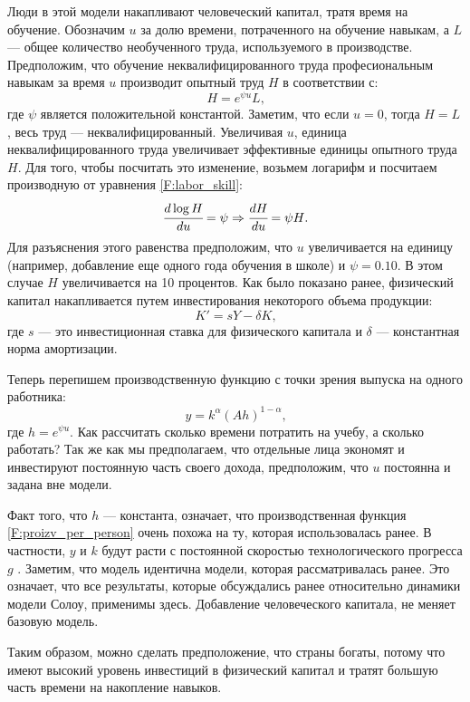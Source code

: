 Люди в этой модели накапливают человеческий капитал, тратя время на обучение.
Обозначим $u$ за долю времени, потраченного на обучение навыкам, а $L$ --- общее количество необученного труда, используемого в производстве.
Предположим, что обучение неквалифицированного труда професиональным навыкам за время $u$ производит опытный труд $H$ в соответствии с:
\begin{equation}
H=e^{\psi u} L \text{,}
\label{F:labor_skill}
\end{equation}
где $\psi$ является положительной константой.
Заметим, что если $u = 0$, тогда $H = L$, весь труд --- неквалифицированный.
Увеличивая $u$, единица неквалифицированного труда увеличивает эффективные единицы опытного труда $H$.
Для того, чтобы посчитать это изменение, возьмем логарифм и посчитаем производную от уравнения \ref{F:labor_skill}:
\begin{equation*}
\cfrac{d \log{H}}{du} = \psi \Rightarrow \cfrac{dH}{du}=\psi H\text{.}
\end{equation*}
Для разъяснения этого равенства предположим, что $u$ увеличивается на единицу (например, добавление еще одного года обучения в школе) и $\psi = 0.10$.
В этом случае $H$ увеличивается на 10 процентов.
Как было показано ранее, физический капитал накапливается путем инвестирования некоторого объема продукции:
\begin{equation*}
K'=sY - \delta K \text{,}
\end{equation*}
где $s$ --- это инвестиционная ставка для физического капитала и $\delta$ --- константная норма амортизации.

Теперь перепишем производственную функцию с точки зрения выпуска на одного работника:
\begin{equation}
y = k^{\alpha}\left(Ah\right)^{1 - \alpha}\text{,}
\label{F:proizv_per_person}
\end{equation}
где $h=e^{\psi u}$.
Как рассчитать сколько времени потратить на учебу, а сколько работать?
Так же как мы предполагаем, что отдельные лица экономят и инвестируют постоянную часть своего дохода, предположим, что $u$ постоянна и задана вне модели.

Факт того, что $h$ --- константа, означает, что производственная функция \ref{F:proizv_per_person} очень похожа на ту, которая использовалась ранее.
В частности, $y$ и $k$ будут расти с постоянной скоростью технологического прогресса $g$ .
Заметим, что модель идентична модели, которая рассматривалась ранее.
Это означает, что все результаты, которые обсуждались ранее относительно динамики модели Солоу, применимы здесь.
Добавление человеческого капитала, не меняет базовую модель.

Таким образом, можно сделать предположение, что страны богаты, потому что имеют высокий уровень инвестиций в физический капитал и тратят большую часть времени на накопление навыков.
